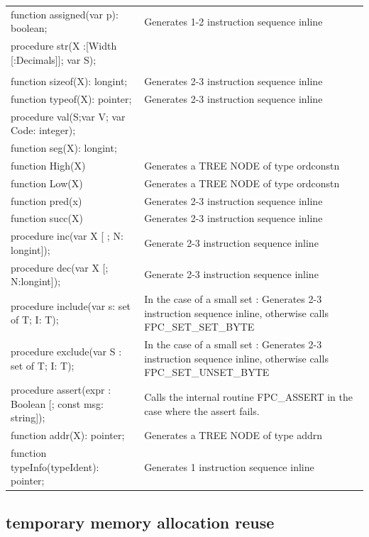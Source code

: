 \documentclass [a4paper,12pt]{article}
\begin{document}
\begin{longtable}{|l|p{7cm}|}
\textsf{function assigned(var p): boolean;}&
   Generates 1-2 instruction sequence inline \\
\textsf{procedure str(X :[Width [:Decimals]]; var S);}& \\
\textsf{}&  \\
\textsf{function sizeof(X): longint;}&
   Generates 2-3 instruction sequence inline \\
\textsf{function typeof(X): pointer;}&
   Generates 2-3 instruction sequence inline \\
\textsf{procedure val(S;var V; var Code: integer);}& \\
\textsf{function seg(X): longint;}& \\
\textsf{function High(X)}&
   Generates a TREE NODE of type ordconstn \\
\textsf{function Low(X)}&
   Generates a TREE NODE of type ordconstn \\
\textsf{function pred(x)}&
   Generates 2-3 instruction sequence inline \\
\textsf{function succ(X)}&
   Generates 2-3 instruction sequence inline \\
\textsf{procedure inc(var X [ ; N: longint]);}&
   Generate 2-3 instruction sequence inline \\
\textsf{procedure dec(var X [; N:longint]);}&
   Generate 2-3 instruction sequence inline \\
\textsf{procedure include(var s: set of T; I: T);}&
   In the case of a small set : Generates 2-3 instruction sequence inline,
   otherwise calls FPC{\_}SET{\_}SET{\_}BYTE \\
\textsf{procedure exclude(var S : set of T; I: T);}&
   In the case of a small set : Generates 2-3 instruction sequence inline,
   otherwise calls FPC{\_}SET{\_}UNSET{\_}BYTE \\
\textsf{procedure assert(expr : Boolean [; const msg: string]);}&
  Calls the internal routine FPC{\_}ASSERT in the case where the assert fails.\\
\textsf{function addr(X): pointer;}&
  Generates a TREE NODE of type addrn \\
\textsf{function typeInfo(typeIdent): pointer;}&
  Generates 1 instruction sequence inline \\
\end{longtable}

\subsection{temporary memory allocation reuse}
\label{subsec:mylabel11}
\end{document}
